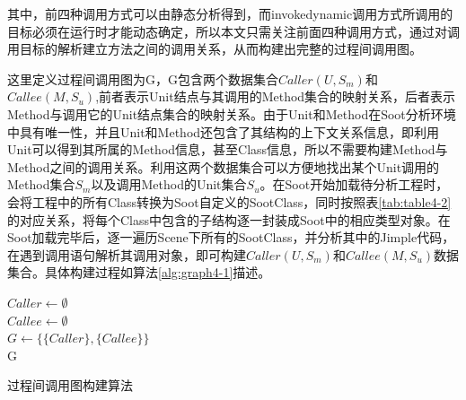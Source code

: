 其中，前四种调用方式可以由静态分析得到，而invokedynamic调用方式所调用的目标必须在运行时才能动态确定，所以本文只需关注前面四种调用方式，通过对调用目标的解析建立方法之间的调用关系，从而构建出完整的过程间调用图。

这里定义过程间调用图为G，G包含两个数据集合$Caller(U,S_m)$和$Callee(M,S_u)$,前者表示Unit结点与其调用的Method集合的映射关系，后者表示Method与调用它的Unit结点集合的映射关系。由于Unit和Method在Soot分析环境中具有唯一性，并且Unit和Method还包含了其结构的上下文关系信息，即利用Unit可以得到其所属的Method信息，甚至Class信息，所以不需要构建Method与Method之间的调用关系。利用这两个数据集合可以方便地找出某个Unit调用的Method集合$S_m$以及调用Method的Unit集合$S_u$。在Soot开始加载待分析工程时，会将工程中的所有Class转换为Soot自定义的SootClass，同时按照表\ref{tab:table4-2}的对应关系，将每个Class中包含的子结构逐一封装成Soot中的相应类型对象。在Soot加载完毕后，逐一遍历Scene下所有的SootClass，并分析其中的Jimple代码，在遇到调用语句解析其调用对象，即可构建$Caller(U,S_m)$和$Callee(M,S_u)$数据集合。具体构建过程如算法\ref{alg:graph4-1}描述。

\begin{algorithm}%
	\LinesNumbered
	$Caller \leftarrow \emptyset$ \\
	$Callee \leftarrow \emptyset$ \\
	$G \leftarrow \{\{Caller\},\{Callee\}\}$ \\
	\Return G
	\caption{过程间调用图构建算法}
	\label{alg:alg4-1}
\end{algorithm}

